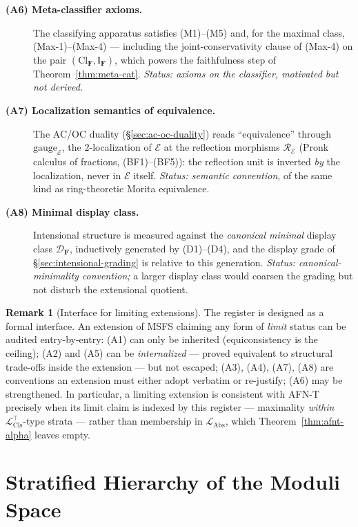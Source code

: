 \documentclass[11pt]{article}
\theoremstyle{plain}
\theoremstyle{definition}
\newtheorem{remark}[theorem]{Remark}
\newcommand{\LClsMax}{\mathcal{L}_{\mathrm{Cls}}^{\top}}
\newcommand{\LAbs}{\mathcal{L}_{\mathrm{Abs}}}
\newcommand{\Cl}{\mathrm{Cl}}
\newcommand{\cE}{\mathcal{E}}
\begin{document}
\begin{description}
\item[\textbf{(A6) Meta-classifier axioms.}] The classifying apparatus satisfies (M1)--(M5) and, for the maximal class, (Max-1)--(Max-4) --- including the joint-conservativity clause of (Max-4) on the pair $(\Cl_{\mathbf{F}}, \mathbb{I}_{\mathbf{F}})$, which powers the faithfulness step of Theorem~\ref{thm:meta-cat}. \emph{Status: axioms on the classifier, motivated but not derived.}
\item[\textbf{(A7) Localization semantics of equivalence.}] The AC/OC duality (\S\ref{sec:ac-oc-duality}) reads ``equivalence'' through $\mathrm{gauge}_\cE$, the $2$-localization of $\cE$ at the reflection morphisms $\mathcal{R}_\cE$ (Pronk calculus of fractions, (BF1)--(BF5)): the reflection unit is inverted \emph{by} the localization, never in $\cE$ itself. \emph{Status: semantic convention}, of the same kind as ring-theoretic Morita equivalence.
\item[\textbf{(A8) Minimal display class.}] Intensional structure is measured against the \emph{canonical minimal} display class $\mathcal{D}_{\mathbf{F}}$, inductively generated by (D1)--(D4), and the display grade of \S\ref{sec:intensional-grading} is relative to this generation. \emph{Status: canonical-minimality convention;} a larger display class would coarsen the grading but not disturb the extensional quotient.
\end{description}

\begin{remark}[Interface for limiting extensions]\label{rem:register-interface}
The register is designed as a formal interface. An extension of MSFS claiming any form of \emph{limit} status can be audited entry-by-entry: (A1) can only be inherited (equiconsistency is the ceiling); (A2) and (A5) can be \emph{internalized} --- proved equivalent to structural trade-offs inside the extension --- but not escaped; (A3), (A4), (A7), (A8) are conventions an extension must either adopt verbatim or re-justify; (A6) may be strengthened. In particular, a limiting extension is consistent with AFN-T precisely when its limit claim is indexed by this register --- maximality \emph{within} $\LClsMax$-type strata --- rather than membership in $\LAbs$, which Theorem~\ref{thm:afnt-alpha} leaves empty.
\end{remark}

\section{Stratified Hierarchy of the Moduli Space}\label{sec:hierarchy}
\end{document}
